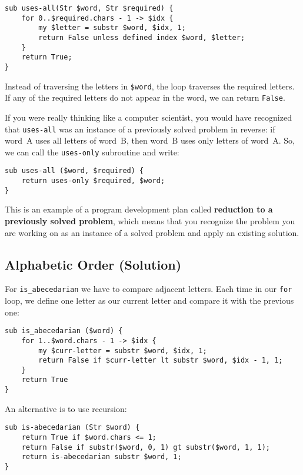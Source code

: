 \begin{verbatim}
sub uses-all(Str $word, Str $required) {
    for 0..$required.chars - 1 -> $idx {
        my $letter = substr $word, $idx, 1;
        return False unless defined index $word, $letter;
    }
    return True;
}
\end{verbatim}
%
Instead of traversing the letters in {\tt \$word}, the loop
traverses the required letters.  If any of the required letters
do not appear in the word, we can return {\tt False}.

If you were really thinking like a computer scientist, you would
have recognized that \verb"uses-all" was an instance of a
previously solved problem in reverse: if word~A uses all 
letters of word~B, then word~B uses only letters of word~A. So, 
we can call the {\tt uses-only} subroutine and write:

\begin{verbatim}
sub uses-all ($word, $required) {
    return uses-only $required, $word;
}
\end{verbatim}
%
This is an example of a program development plan called 
{\bf reduction to a previously solved problem}, which means that you
recognize the problem you are working on as an instance of a solved
problem and apply an existing solution. 

\subsection{Alphabetic Order (Solution)}

For \verb"is_abecedarian" we have to compare adjacent letters. 
Each time in our {\tt for} loop, we define one letter as our 
current letter and compare it with the previous one:

\begin{verbatim}
sub is_abecedarian ($word) {
    for 1..$word.chars - 1 -> $idx {    
        my $curr-letter = substr $word, $idx, 1;
        return False if $curr-letter lt substr $word, $idx - 1, 1;  
    }     
    return True
}
\end{verbatim}

An alternative is to use recursion:

\begin{verbatim}
sub is-abecedarian (Str $word) {
    return True if $word.chars <= 1;
    return False if substr($word, 0, 1) gt substr($word, 1, 1);
    return is-abecedarian substr $word, 1;
}
\end{verbatim}

